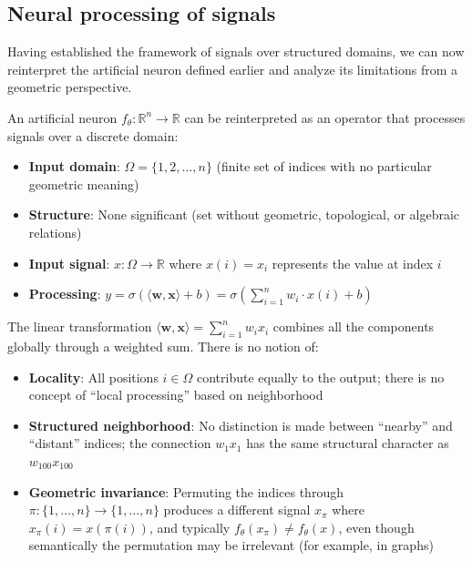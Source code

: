 \subsection{Neural processing of signals}\label{sec:neurona_senales}

Having established the framework of signals over structured domains, we can now reinterpret the artificial neuron defined earlier and analyze its limitations from a geometric perspective.

An artificial neuron $f_\theta: \mathbb{R}^n \to \mathbb{R}$ can be reinterpreted as an operator that processes signals over a discrete domain:

\begin{itemize}
	\item \textbf{Input domain}: $\Omega = \{1, 2, \ldots, n\}$ (finite set of indices with no particular geometric meaning)
	\item \textbf{Structure}: None significant (set without geometric, topological, or algebraic relations)
	\item \textbf{Input signal}: $x: \Omega \to \mathbb{R}$ where $x(i) = x_i$ represents the value at index $i$
	\item \textbf{Processing}: $y = \sigma(\langle \mathbf{w}, \mathbf{x} \rangle + b) = \sigma\left(\sum_{i=1}^n w_i \cdot x(i) + b\right)$
\end{itemize}

The linear transformation $\langle \mathbf{w}, \mathbf{x} \rangle = \sum_{i=1}^n w_i x_i$ combines all the components globally through a weighted sum. There is no notion of:

\begin{itemize}
	\item \textbf{Locality}: All positions $i \in \Omega$ contribute equally to the output; there is no concept of ``local processing'' based on neighborhood

	\item \textbf{Structured neighborhood}: No distinction is made between ``nearby'' and ``distant'' indices; the connection $w_1 x_1$ has the same structural character as $w_{100} x_{100}$

	\item \textbf{Geometric invariance}: Permuting the indices through $\pi: \{1,\ldots,n\} \to \{1,\ldots,n\}$ produces a different signal $x_\pi$ where $x_\pi(i) = x(\pi(i))$, and typically $f_\theta(x_\pi) \neq f_\theta(x)$, even though semantically the permutation may be irrelevant (for example, in graphs)
\end{itemize}

